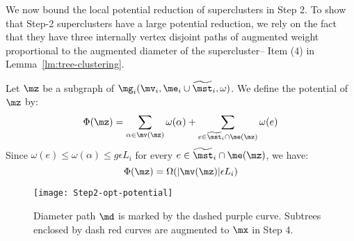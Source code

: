 We now bound the local potential reduction of superclusters in Step 2. To show that Step-2 superclusters have a large potential reduction, we rely on the fact that they have three internally vertex disjoint paths of augmented weight proportional to the augmented diameter of the supercluster-- Item (4) in Lemma~\ref{lm:tree-clustering}.

Let $\mz$ be a subgraph of $\mg_i(\mv_i,\me_i\cup \widetilde{\mst}_i,\omega)$. We define the potential of $\mz$ by:
\begin{equation}\label{eq:mz}
\Phi(\mz) = \sum_{\alpha \in \mv(\mz)}\omega(\alpha) + \sum_{e \in \widetilde{\mst}_i\cap \me(\mz)} \omega(e)
\end{equation}
Since $\omega(e)\leq \omega(\alpha) \leq g\epsilon L_i$ for every $e \in \widetilde{\mst}_i\cap \me(\mz)$, we have:
\begin{equation}\label{eq:Potential-vs-Size}
\Phi(\mz) = \Omega(|\mv(\mz)|\epsilon L_i)
\end{equation}


\begin{wrapfigure}{r}{0.3\textwidth}
	\vspace{-25pt}
	\begin{center}
		\texttt{[image: Step2-opt-potential]}
	\end{center}
	\caption{\footnotesize{Diameter path $\md$ is marked by the dashed purple curve. Subtrees enclosed by dash red curves are augmented to $\mx$ in Step 4.}}
	\vspace{-10pt}
	\label{fig:Step2-opt-potential}
\end{wrapfigure}


